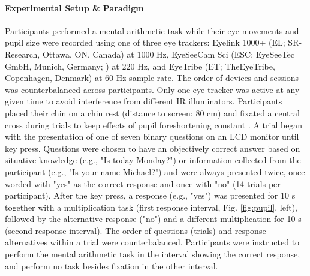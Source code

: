 \documentclass[manuscript]{acmart}
\begin{document}
\paragraph{Experimental Setup \& Paradigm} Participants performed a mental arithmetic task while their eye movements and pupil size were recorded using one of three eye trackers: Eyelink 1000+ (EL; SR-Research, Ottawa, ON, Canada) at 1000 Hz, EyeSeeCam Sci (ESC; EyeSeeTec GmbH, Munich, Germany; \cite{Stoll2011,Schneider2009}) at 220 Hz, and EyeTribe (ET; TheEyeTribe, Copenhagen, Denmark) at 60 Hz sample rate. The order of devices and sessions was counterbalanced across participants. Only one eye tracker was active at any given time to avoid interference from different IR illuminators. Participants placed their chin on a chin rest (distance to screen: 80 cm) and fixated a central cross during trials to keep effects of pupil foreshortening constant \cite{Hayes2016,Drewes2012}. A trial began with the presentation of one of seven binary questions on an LCD monitor until key press. Questions were chosen to have an objectively correct answer based on situative knowledge (e.g., "Is today Monday?") or information collected from the participant (e.g., "Is your name Michael?") and were always presented twice, once worded with "yes" as the correct response and once with "no" (14 trials per participant). After the key press, a  response (e.g., "yes") was presented for 10 s together with a multiplication task (first response interval, Fig. \ref{fig:pupil}, left), followed by the alternative response ("no") and a different multiplication for 10 s (second response interval). The order of questions (trials) and response alternatives within a trial were counterbalanced. Participants were instructed to perform the mental arithmetic task in the interval showing the correct response, and perform no task besides fixation in the other interval. 
\end{document}
